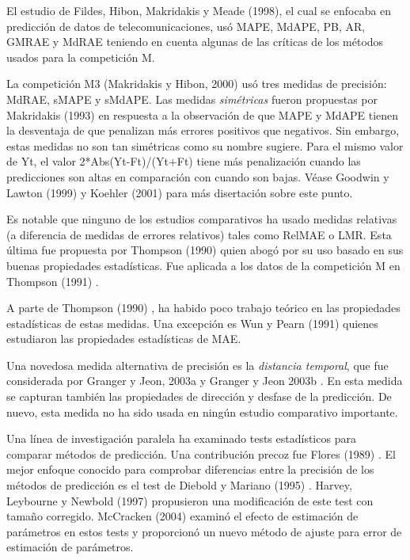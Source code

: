 \documentclass{llncs}
\begin{document}
El estudio de Fildes, Hibon, Makridakis y Meade (1998), el cual se enfocaba en predicción de datos de telecomunicaciones, usó MAPE, MdAPE, PB, AR, GMRAE y MdRAE teniendo en cuenta algunas de las críticas de los métodos usados para la competición M.

La competición M3 (Makridakis y Hibon, 2000) \cite{Makridakis2000451} usó tres medidas de precisión: MdRAE, sMAPE y sMdAPE. Las medidas \emph{simétricas} fueron propuestas por Makridakis (1993) \cite{Makridakis1993527} en respuesta a la observación de que MAPE y MdAPE tienen la desventaja de que penalizan más errores positivos que negativos. Sin embargo, estas medidas no son tan simétricas como su nombre sugiere. Para el mismo valor de Yt, el valor 2*Abs(Yt-Ft)/(Yt+Ft) tiene más penalización cuando las predicciones son altas en comparación con cuando son bajas. Véase Goodwin y Lawton (1999) \cite{Goodwin1999405} y Koehler (2001) \cite{Koehler2001269} para más disertación sobre este punto.

Es notable que ninguno de los estudios comparativos ha usado medidas relativas (a diferencia de medidas de errores relativos) tales como RelMAE o LMR. Esta última fue propuesta por Thompson (1990) \cite{Thompson1990219}quien abogó por su uso basado en sus buenas propiedades estadísticas. Fue aplicada a los datos de la competición M en Thompson (1991) \cite{Thompson1991331}.

A parte de Thompson (1990) \cite{Thompson1990219}, ha habido poco trabajo teórico en las propiedades estadísticas de estas medidas. Una excepción es Wun y Pearn (1991) quienes estudiaron las propiedades estadísticas de MAE.

Una novedosa medida alternativa de precisión es la \emph{distancia temporal}, que fue considerada por Granger y Jeon, 2003a \cite{Granger2003199} y Granger y Jeon 2003b \cite{Granger2003339}. En esta medida se capturan también  las propiedades de dirección y desfase de la predicción. De nuevo, esta medida no ha sido usada en ningún estudio comparativo importante.

Una línea de investigación paralela ha examinado tests estadísticos para comparar métodos de predicción. Una contribución precoz fue Flores (1989) \cite{Flores1989529}. El mejor enfoque conocido para comprobar diferencias entre la precisión de los métodos de predicción es el test de Diebold y Mariano (1995) \cite{Diebold1995253}. Harvey, Leybourne y Newbold (1997) \cite{Harvey1997281} propusieron una modificación de este test con tamaño corregido. McCracken (2004) \cite{McCracken2004503} examinó el efecto de estimación de parámetros en estos tests y proporcionó un nuevo método de ajuste para error de estimación de parámetros.
\end{document}
